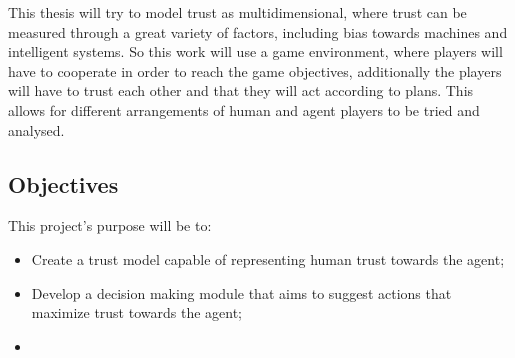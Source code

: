 This thesis will try to model trust as multidimensional, where trust can be measured through a great variety of factors, including bias towards machines and intelligent systems. So this work will use a game environment, where players will have to cooperate in order to reach the game objectives, additionally the players will have to trust each other and that they will act according to plans. This allows for different arrangements of human and agent players to be tried and analysed.




\subsection{Objectives}
\label{subsec:Objectives}

This project's purpose will be to:
\begin{itemize}
	\item Create a trust model capable of representing human trust towards the agent;
	\item Develop a decision making module that aims to suggest actions that maximize trust towards the agent;
	\item 
\end{itemize}



